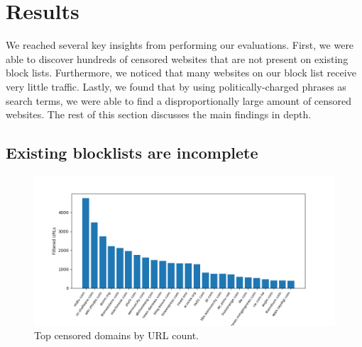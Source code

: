 \section{Results}
We reached several key insights from performing our
evaluations. First, we were able to discover hundreds of
censored websites that are not present on existing block
lists. Furthermore, we noticed that many websites on our block list
receive very little traffic. Lastly, we found that by using
politically-charged phrases as search terms, we were able to find a
disproportionally large amount of censored websites. The rest of this
section discusses the main findings in depth.

\subsection{Existing blocklists are incomplete}

\begin{figure}[t]
  \centering
  \includegraphics[scale=0.6]{figures/top-domains}
  \caption{\label{top-domains}Top censored domains by URL count.}
\end{figure}

\begin{table}[b]
  \begin{center}
  \end{center}
\caption{\label{breakdown} Total number of censored domains discovered.}
\end{table}

